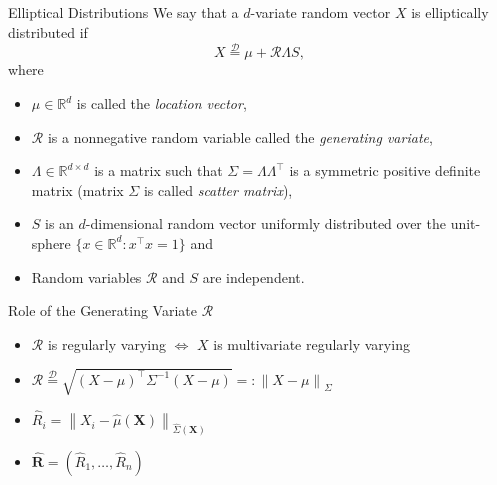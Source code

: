 \documentclass[11pt, aspectratio=169]{beamer}
\begin{document}
\begin{frame}{Elliptical Distributions \parencite{cambanis1981}} We say that a
  $d$-variate random vector $X$ is elliptically distributed if
  \begin{equation*}
    X \stackrel{\mathcal{D}}{=} \mu + \mathcal{R} \Lambda  S,
  \end{equation*}
  where
  \begin{itemize}
    \item $\mu\in\mathbb{R}^d$ is called the \emph{location vector},
    \item $\mathcal{R}$ is a nonnegative random variable called the
    \emph{generating variate},
    \item $\Lambda \in \mathbb{R}^{d\times d}$ is a matrix such that $\Sigma =
    \Lambda \Lambda^\intercal$ is a symmetric positive definite matrix (matrix
    $\Sigma$ is called \emph{scatter matrix}),
    \item $S$ is an $d$-dimensional random vector uniformly distributed over the
    unit-sphere $\{x\in\mathbb{R}^d: x^\intercal x = 1\}$ and
    \item Random variables $\mathcal{R}$ and $S$ are independent.
  \end{itemize}
\end{frame}


\begin{frame}{Role of the Generating Variate $\mathcal{R}$}
  \begin{itemize}
    \item $\mathcal{R}$ is regularly varying $\iff$ $X$ is multivariate
    regularly varying \parencite{hult2002}
    \item $\mathcal{R} \stackrel{\mathcal{D}}{=} \sqrt{\left(X -
    \mu\right)^\intercal \Sigma^{-1}\left(X - \mu\right)} =: \left\|X -
    \mu\right\|_{\Sigma}$
    \item $\hat R_i = \left\|X_i - \hat\mu\left(\bm X\right)\right\|
    _{\hat\Sigma\left(\bm X\right)}$
    \item $\hat{\bm R} = (\hat R_1, \ldots, \hat R_n)$
  \end{itemize}
\end{frame}

\end{document}
